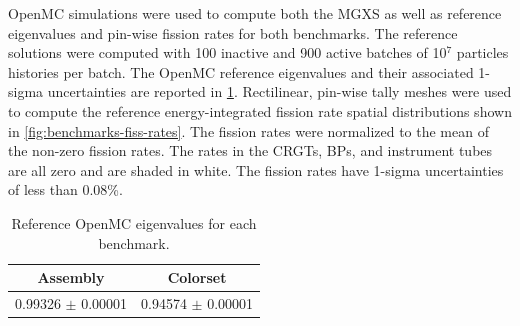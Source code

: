 OpenMC simulations were used to compute both the MGXS as well as reference eigenvalues and pin-wise fission rates for both benchmarks. The reference solutions were computed with 100 inactive and 900 active batches of 10$^7$ particles histories per batch. The OpenMC reference eigenvalues and their associated 1-sigma uncertainties are reported in \cref{tab:keff-reference}. Rectilinear, pin-wise tally meshes were used to compute the reference energy-integrated fission rate spatial distributions shown in \cref{fig:benchmarks-fiss-rates}. The fission rates were normalized to the mean of the non-zero fission rates. The rates in the CRGTs, BPs, and instrument tubes are all zero and are shaded in white. The fission rates have 1-sigma uncertainties of less than 0.08\%.

\begin{table}[h!]
  \centering
  \caption{Reference OpenMC eigenvalues for each benchmark.}
  \label{tab:keff-reference}
  \begin{tabular}{c c}
  \toprule
  {\bf Assembly} &
  {\bf Colorset} \\
  \midrule
  0.99326 $\pm$ 0.00001 & 0.94574 $\pm$ 0.00001 \\
  \bottomrule
\end{tabular}
\end{table}


